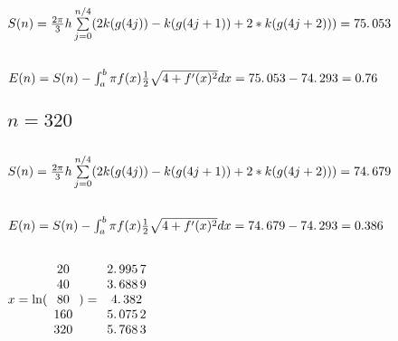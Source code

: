 \documentclass{article}
\begin{document}
\subsection{$S(n)=\frac{2\protect\pi }{3}h\sum%
\limits_{j=0}^{n/4}(2k(g(4j))-k(g(4j+1))+2\ast k(g(4j+2)))=75.\,\allowbreak
053\allowbreak $}

\subsection{$E(n)=S(n)-\protect\int_{a}^{b}\protect\pi f(x)\frac{1}{2}%
\protect\sqrt{4+f^{\prime }(x)^{2}}dx=\allowbreak 75.\,\allowbreak
053\allowbreak -\allowbreak \allowbreak 74.\,\allowbreak 293=\allowbreak
0.76 $}

\bigskip

\subsection{$n=320$}

\subsection{$S(n)=\frac{2\protect\pi }{3}h\sum%
\limits_{j=0}^{n/4}(2k(g(4j))-k(g(4j+1))+2\ast k(g(4j+2)))=\allowbreak
74.\,\allowbreak 679$}

\subsection{$E(n)=S(n)-\protect\int_{a}^{b}\protect\pi f(x)\frac{1}{2}%
\protect\sqrt{4+f^{\prime }(x)^{2}}dx=\allowbreak 74.\,\allowbreak
679\allowbreak -\allowbreak \allowbreak 74.\,\allowbreak 293=\allowbreak
0.386\,$}

\subsection{$x=\ln (%
\protect\begin{array}{c}
20\protect \\ 
40\protect \\ 
80\protect \\ 
160\protect \\ 
320%
\protect\end{array}%
)=\allowbreak 
\protect\begin{array}{c}
2.\,\allowbreak 995\,7\protect \\ 
3.\,\allowbreak 688\,9\protect \\ 
4.\,\allowbreak 382\protect \\ 
5.\,\allowbreak 075\,2\protect \\ 
5.\,\allowbreak 768\,3%
\protect\end{array}%
\allowbreak $}
\end{document}
